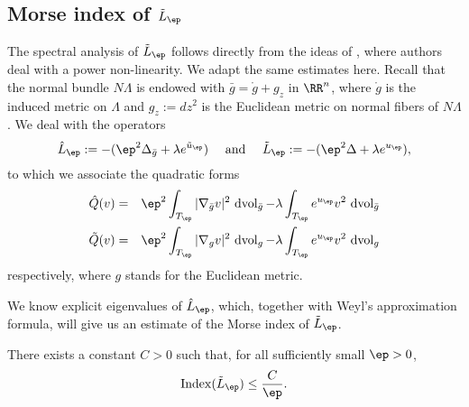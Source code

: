 
\subsection{Morse index of $\tilde L_\ep$}

The spectral analysis of $\tilde L_\ep$ follows directly from the ideas of
\cite{Pacard2014}, where authors deal with a power non-linearity. We adapt the
same estimates here. Recall that the normal bundle $N\Lambda$ is endowed with
$\bar g= \mathring g + g_z$ in $\RR^n$, where $\mathring g$ is the induced
metric on $\Lambda$ and $g_z:=dz^2$ is the Euclidean metric on normal fibers of
$N\Lambda$. We deal with the operators
$$\hat L_\ep:=-(\ep^2\Delta_{\bar g}+\lambda e^{\tilde u_\ep}) \quad \mbox{ and
} \quad \tilde L_\ep := -(\ep^2\Delta + \lambda e^{u_\ep}),$$
to which we associate the quadratic forms
\begin{eqnarray*}
    \hat Q(v) &=& \ep^2 \int_{T_\ep}|\nabla_{\bar g} v|^2\, \operatorname{dvol}_{\bar g}
    - \lambda \int_{T_\ep}e^{u_\ep}v^2 \, \operatorname{dvol}_{\bar g}\\
    \tilde Q(v) &=& \ep^2 \int_{T_\ep}|\nabla_{g} v|^2\, \operatorname{dvol}_{g}
    - \lambda \int_{T_\ep}e^{u_\ep}v^2 \, \operatorname{dvol}_{g}\\
\end{eqnarray*}
respectively, where $g$ stands for the Euclidean metric.

We know explicit eigenvalues of $\hat L_\ep$, which, together with Weyl's
approximation formula, will give us an estimate of the Morse index of
$\tilde L_\ep$.

\begin{lemma}
There exists a constant $C>0$ such that, for all sufficiently small $\ep>0$,
$$
\operatorname{Index}(\tilde L_\ep)\leq \frac{C}{\ep}.
$$
\end{lemma}


